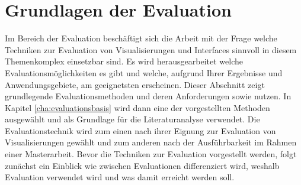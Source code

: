 \documentclass[draft=false
              ,paper=a4
              ,twoside=false
              ,fontsize=11pt
              ,headsepline
              ,BCOR10mm
              ,DIV11
              ]{scrbook}
\begin{document}
\section{Grundlagen der Evaluation} %
\label{sec:grundlagen_der_evaluation}
Im Bereich der Evaluation beschäftigt sich die Arbeit mit der Frage welche Techniken zur Evaluation von Visualisierungen und Interfaces sinnvoll in diesem Themenkomplex einsetzbar sind. Es wird herausgearbeitet welche Evaluationsmöglichkeiten es gibt und welche, aufgrund Ihrer Ergebnisse und Anwendungsgebiete, am geeignetsten erscheinen. Dieser Abschnitt zeigt grundlegende Evaluationsmethoden und deren Anforderungen sowie nutzen. In Kapitel \ref{cha:evaluationsbasis} wird dann eine der vorgestellten Methoden ausgewählt und als Grundlage für die Literaturanalyse verwendet. Die Evaluationstechnik wird zum einen nach ihrer Eignung zur Evaluation von Visualisierungen gewählt und zum anderen nach der Ausführbarkeit im Rahmen einer Masterarbeit.
Bevor die Techniken zur Evaluation vorgestellt werden, folgt zunächst ein Einblick wie zwischen Evaluationen differenziert wird, weshalb Evaluation verwendet wird und was damit erreicht werden soll.
\end{document}
